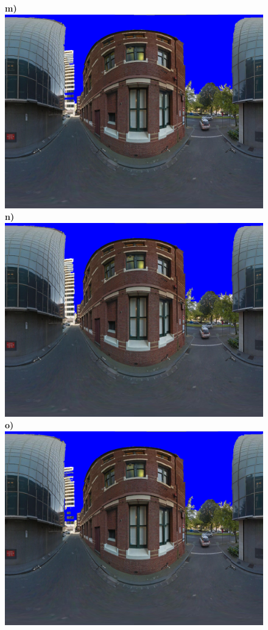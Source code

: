 \documentclass[final,3p,times,authoryear]{elsarticle}
\begin{document}
\begin{figure}
\textbf{m)}\includegraphics[scale=0.08]{Images/mean/0070_3_6_100_ms_sky_mark.png} 
\textbf{n)}\includegraphics[scale=0.08]{Images/mean/0070_7_6_100_ms_sky_mark.png} 
\textbf{o)}\includegraphics[scale=0.08]{Images/mean/0070_5_7_210_ms_sky_mark.png} 

\end{figure}
\end{document}
